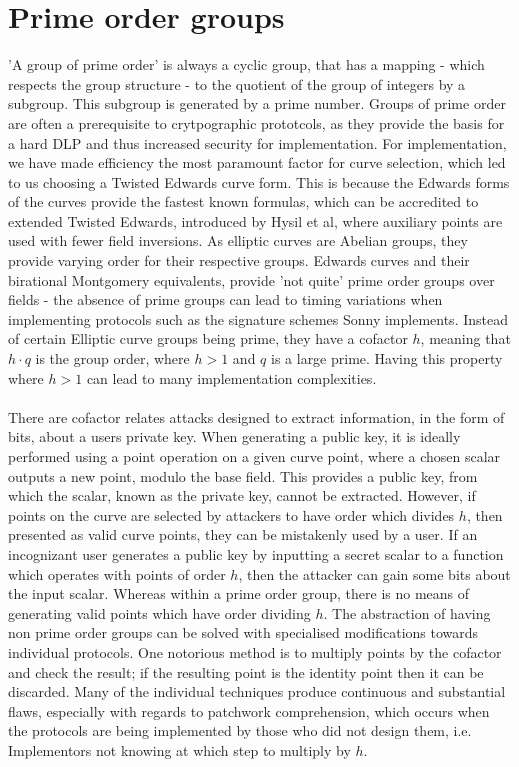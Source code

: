\documentclass{article}
\begin{document}
\section{Prime order groups}
'A group of prime order' is always a cyclic group, that has a mapping - which respects the group structure - to the quotient of the group of integers by a subgroup. This subgroup is generated by a prime number. Groups of prime order are often a prerequisite to crytpographic prototcols, as they provide the basis for a hard DLP and thus increased security for implementation. For implementation, we have made efficiency the most paramount factor for curve selection, which led to us choosing a Twisted Edwards curve form. This is because the Edwards forms of the curves provide the fastest known formulas, which can be accredited to extended Twisted Edwards, introduced by Hysil et al, where auxiliary points are used with fewer field inversions. As elliptic curves are Abelian groups, they provide varying order for their respective groups. Edwards curves and their birational Montgomery equivalents, provide 'not quite' prime order groups over fields - the absence of prime groups can lead to timing variations when implementing protocols such as the signature schemes Sonny implements. Instead of certain Elliptic curve groups being prime, they have a cofactor $h$, meaning that $h \cdot q$ is the group order, where $h > 1$ and $q$ is a large prime. Having this property where $h > 1$ can lead to many implementation complexities.\\\\
There are cofactor relates attacks designed to extract information, in the form of bits, about a users private key. When generating a public key, it is ideally performed using a point operation on a given curve point, where a chosen scalar outputs a new point, modulo the base field. This provides a public key, from which the scalar, known as the private key, cannot be extracted. However, if points on the curve are selected by attackers to have order which divides $h$, then presented as valid curve points, they can be mistakenly used by a user. If an incognizant user generates a public key by inputting a secret scalar to a function which operates with points of order $h$, then the attacker can gain some bits about the input scalar. Whereas within a prime order group, there is no means of generating valid points which have order dividing $h$. The abstraction of having non prime order groups can be solved with specialised modifications towards individual protocols. One notorious method is to multiply points by the cofactor and check the result; if the resulting point is the identity point then it can be discarded. Many of the individual techniques produce continuous and substantial flaws, especially with regards to patchwork comprehension, which occurs when the protocols are being implemented by those who did not design them, i.e. Implementors not knowing at which step to multiply by $h$. 
\end{document}
